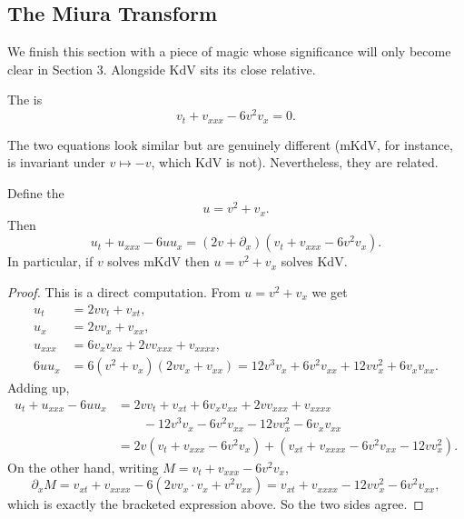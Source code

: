 \subsection{The Miura Transform}

We finish this section with a piece of magic whose significance will only become clear in Section 3. Alongside KdV sits its close relative.

\begin{definition}[mKdV]
	The  is
	$$
	v_t + v_{xxx} - 6v^2v_x = 0.
	$$
\end{definition}

The two equations look similar but are genuinely different (mKdV, for instance, is invariant under $v\mapsto -v$, which KdV is not). Nevertheless, they are related.

\begin{proposition}
	Define the 
	$$
	u = v^2 + v_x.
	$$
	Then
	$$
	u_t + u_{xxx} - 6uu_x = \left(2v + \partial_x\right)\left(v_t + v_{xxx} - 6v^2v_x\right).
	$$
	In particular, if $v$ solves mKdV then $u = v^2 + v_x$ solves KdV.
\end{proposition}
\begin{proof}
	This is a direct computation. From $u = v^2+v_x$ we get
	\begin{align*}
		u_t &= 2vv_t + v_{xt},\\
		u_x &= 2vv_x + v_{xx},\\
		u_{xxx} &= 6v_xv_{xx} + 2vv_{xxx} + v_{xxxx},\\
		6uu_x &= 6(v^2+v_x)(2vv_x+v_{xx}) = 12v^3v_x + 6v^2v_{xx} + 12vv_x^2 + 6v_xv_{xx}.
	\end{align*}
	Adding up,
	\begin{align*}
		u_t + u_{xxx} - 6uu_x &= 2vv_t + v_{xt} + 6v_xv_{xx} + 2vv_{xxx} + v_{xxxx}\\
		&\qquad - 12v^3v_x - 6v^2v_{xx} - 12vv_x^2 - 6v_xv_{xx}\\
		&= 2v\left(v_t + v_{xxx} - 6v^2v_x\right) + \left(v_{xt} + v_{xxxx} - 6v^2v_{xx} - 12vv_x^2\right).
	\end{align*}
	On the other hand, writing $M = v_t + v_{xxx} - 6v^2v_x$,
	$$
	\partial_x M = v_{xt} + v_{xxxx} - 6\left(2vv_x\cdot v_x + v^2v_{xx}\right) = v_{xt} + v_{xxxx} - 12vv_x^2 - 6v^2v_{xx},
	$$
	which is exactly the bracketed expression above. So the two sides agree.
\end{proof}


